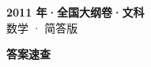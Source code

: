 \documentclass[zihao=-4, a4paper]{ctexart}
\begin{document}
\begin{center}
  {\Large\bfseries 2011 年·全国大纲卷·文科}\\[4pt]
  {\large 数学 · 简答版}
\end{center}
\medskip
{}

\clearpage
{}
\begin{center}{\Large\bfseries 答案速查}\end{center}
\medskip

\end{document}
